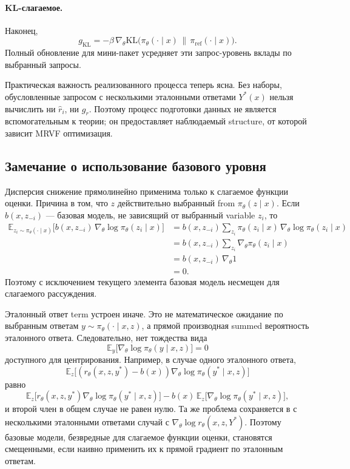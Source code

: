 \paragraph{KL-слагаемое.}
Наконец,
\[
 g_{\mathrm{KL}}
 =
 -\beta\,
 \nabla_{\theta}
 \mathrm{KL}\big(
 \pi_{\theta}(\cdot\mid x)\,\|\,\pi_{\mathrm{ref}}(\cdot\mid x)
 \big).
\]
Полный обновление для мини-пакет усредняет эти запрос-уровень вклады по выбранный запросы.

Практическая важность реализованного процесса теперь ясна. Без наборы, обусловленные запросом с несколькими эталонными ответами \(Y^{*}(x)\) нельзя вычислить ни \(\hat r_i\), ни \(g_r\). Поэтому процесс подготовки данных не является вспомогательным к теории; он предоставляет наблюдаемый structure, от которой зависит MRVF оптимизация.

\subsection{Замечание о использование базового уровня}

Дисперсия снижение прямолинейно применима только к слагаемое функции оценки. Причина в том, что \(z\) действительно выбранный from \(\pi_{\theta}(z\mid x)\). Если \(b(x,z_{-i})\) --- базовая модель, не зависящий от выбранный variable \(z_i\), то
\begin{align*}
 \mathbb{E}_{z_i\sim\pi_{\theta}(\cdot\mid x)}
 \big[
 b(x,z_{-i})\,\nabla_{\theta}\log\pi_{\theta}(z_i\mid x)
 \big]
 & =
 b(x,z_{-i})
 \sum_{z_i}\pi_{\theta}(z_i\mid x)\,
 \nabla_{\theta}\log\pi_{\theta}(z_i\mid x) \\
 & =
 b(x,z_{-i})
 \sum_{z_i}\nabla_{\theta}\pi_{\theta}(z_i\mid x) \\
 & =
 b(x,z_{-i})\,\nabla_{\theta}1 \\
 & = 0.
\end{align*}
Поэтому с исключением текущего элемента базовая модель несмещен для слагаемого рассуждения.

Эталонный ответ term устроен иначе. Это не математическое ожидание по выбранным ответам \(y\sim\pi_{\theta}(\cdot\mid x,z)\), а прямой производная summed вероятность эталонного ответа. Следовательно, нет тождества вида
\[
 \mathbb{E}_{y}\big[\nabla_{\theta}\log\pi_{\theta}(y\mid x,z)\big]=0
\]
доступного для центрирования. Например, в случае одного эталонного ответа,
\[
 \mathbb{E}_{z}
 \big[
 (r_{\theta}(x,z,y^{*})-b(x))
 \nabla_{\theta}\log\pi_{\theta}(y^{*}\mid x,z)
 \big]
\]
равно
\[
 \mathbb{E}_{z}
 \big[
 r_{\theta}(x,z,y^{*})
 \nabla_{\theta}\log\pi_{\theta}(y^{*}\mid x,z)
 \big]
 -
 b(x)\,
 \mathbb{E}_{z}
 \big[
 \nabla_{\theta}\log\pi_{\theta}(y^{*}\mid x,z)
 \big],
\]
и второй член в общем случае не равен нулю. Та же проблема сохраняется в с несколькими эталонными ответами случай с \(\nabla_{\theta}\log r_{\theta}(x,z,Y^{*})\). Поэтому базовые модели, безвредные для слагаемое функции оценки, становятся смещенными, если наивно применить их к прямой градиент по эталонным ответам.

